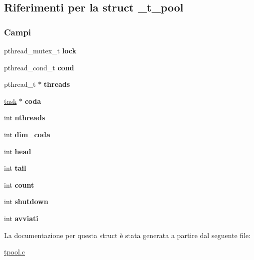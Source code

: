 \hypertarget{struct__t__pool}{}\subsection{Riferimenti per la struct \+\_\+t\+\_\+pool}
\label{struct__t__pool}
\subsubsection*{Campi}
\begin{DoxyCompactItemize}
\item 
\mbox{\label{struct__t__pool_a3fa217999d9133ff8b642c0d18b74c69}} 
pthread\+\_\+mutex\+\_\+t {\bfseries lock}
\item 
\mbox{\label{struct__t__pool_aefb1ce56ce4c8a44f9eeefe225e02a49}} 
pthread\+\_\+cond\+\_\+t {\bfseries cond}
\item 
\mbox{\label{struct__t__pool_a801c5fbf1c3cd0c7402fa6d0010532ae}} 
pthread\+\_\+t $\ast$ {\bfseries threads}
\item 
\mbox{\label{struct__t__pool_a9ee32dc7f190cce29400f8e6a3778243}} 
\mbox{\hyperlink{struct__task}{task}} $\ast$ {\bfseries coda}
\item 
\mbox{\label{struct__t__pool_aeb0e282bcea48013b51ef7b4d65f80fd}} 
int {\bfseries nthreads}
\item 
\mbox{\label{struct__t__pool_a9a09e2ab1ba3f99d50fdcb8baa407653}} 
int {\bfseries dim\+\_\+coda}
\item 
\mbox{\label{struct__t__pool_afc14846e394f4e56ebdbd2661e9ead6b}} 
int {\bfseries head}
\item 
\mbox{\label{struct__t__pool_af00eb15c7a7dbb16df397911bc7cfeed}} 
int {\bfseries tail}
\item 
\mbox{\label{struct__t__pool_a2ad97a5daa13fc093520f5877c44d8a4}} 
int {\bfseries count}
\item 
\mbox{\label{struct__t__pool_a4009330765daae886fb66bf701f6546e}} 
int {\bfseries shutdown}
\item 
\mbox{\label{struct__t__pool_a019471e3eb67ab1506cd2fd0c9670490}} 
int {\bfseries avviati}
\end{DoxyCompactItemize}


La documentazione per questa struct è stata generata a partire dal seguente file\+:\begin{DoxyCompactItemize}
\item 
\mbox{\hyperlink{tpool_8c}{tpool.\+c}}\end{DoxyCompactItemize}
